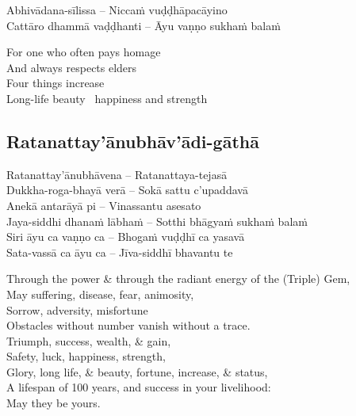 \suttaRef{[Khp A]}

\begin{twochants}
  Abhivādana-sīlissa – Niccaṁ vuḍḍhāpacāyino\\
  Cattāro dhammā vaḍḍhanti – Āyu vaṇṇo sukhaṁ balaṁ
\end{twochants}

\begin{english-verses}
  For one who often pays homage\\
  And always respects elders\\
  Four things increase\\
  Long-life beauty \breathmark\ happiness and strength
\end{english-verses}

\suttaRef{[Dhp 109]}

\subsection{Ratanattay'ānubhāv'ādi-gāthā}
\label{ratanattayanubhavadi-gatha}

\begin{pali-hang}
Ratanattay'ānubhāvena – Ratanattaya-tejasā\\
Dukkha-roga-bhayā verā – Sokā sattu c'upaddavā\\
Anekā antarāyā pi – Vinassantu asesato\\
Jaya-siddhi dhanaṁ lābhaṁ – Sotthi bhāgyaṁ sukhaṁ balaṁ\\
Siri āyu ca vaṇṇo ca – Bhogaṁ vuḍḍhī ca yasavā\\
Sata-vassā ca āyu ca – Jīva-siddhī bhavantu te
\end{pali-hang}

\begin{english-verses}
  Through the power \& through the radiant energy of the (Triple) Gem,\\
  May suffering, disease, fear, animosity,\\
  Sorrow, adversity, misfortune\\
  Obstacles without number vanish without a trace.\\
  Triumph, success, wealth, \& gain,\\
  Safety, luck, happiness, strength,\\
  Glory, long life, \& beauty, fortune, increase, \& status,\\
  A lifespan of 100 years, and success in your livelihood:\\
  May they be yours.
\end{english-verses}

